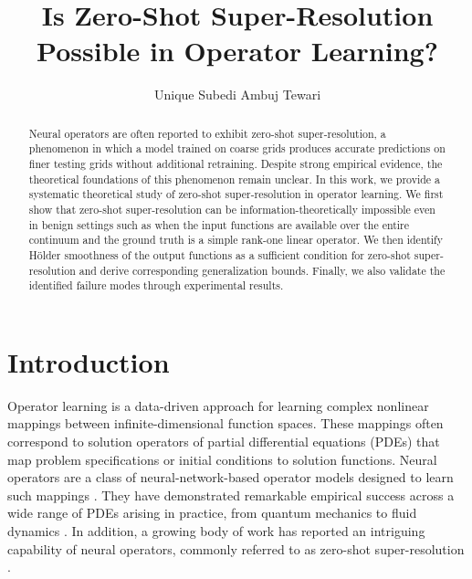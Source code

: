 \documentclass[11pt]{article}
\theoremstyle{plain}
\begin{document}
\title{Is Zero-Shot Super-Resolution Possible in Operator Learning?}
\author[ ]{Unique Subedi \qquad \qquad  Ambuj Tewari}
\date{}




\maketitle


\begin{abstract}%
   Neural operators are often reported to exhibit zero-shot super-resolution, a phenomenon in which a model trained on coarse grids produces accurate predictions on finer testing grids without additional retraining. Despite strong empirical evidence, the theoretical foundations of this phenomenon remain unclear. In this work, we provide a systematic theoretical study of zero-shot super-resolution in operator learning. We first show that zero-shot super-resolution can be information-theoretically impossible even in benign settings such as when the input functions are available over the entire continuum and the ground truth is a simple rank-one linear operator. We then identify H{\" o}lder smoothness of the output functions as a sufficient condition for zero-shot super-resolution and derive corresponding generalization bounds. Finally, we also validate the identified failure modes through experimental results.
\end{abstract}




\section{Introduction}
Operator learning is a data-driven approach for learning complex nonlinear mappings between infinite-dimensional function spaces. These mappings often correspond to solution operators of partial differential equations (PDEs) that map problem specifications or initial conditions to solution functions. Neural operators are a class of neural-network-based operator models designed to learn such mappings \citep{kovachki2023neural}. They have demonstrated remarkable empirical success across a wide range of PDEs arising in practice, from quantum mechanics \citep{mizera2023scattering} to fluid dynamics \citep{wang2024recent}. In addition, a growing body of work has reported an intriguing capability of neural operators, commonly referred to as zero-shot super-resolution \citep{li2020fourier}. 
\end{document}
